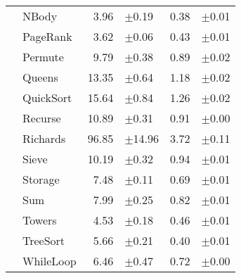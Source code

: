 \begin{tabular}{ll@{\hspace{6pt}}r@{\hspace{3pt}}l@{\hspace{6pt}}r@{\hspace{3pt}}l}
 & NBody & 3.96 & \scriptsize\textcolor{gray!60}{$\pm$0.19} & 0.38 & \scriptsize\textcolor{gray!60}{$\pm$0.01} \\
 & PageRank & 3.62 & \scriptsize\textcolor{gray!60}{$\pm$0.06} & 0.43 & \scriptsize\textcolor{gray!60}{$\pm$0.01} \\
 & Permute & 9.79 & \scriptsize\textcolor{gray!60}{$\pm$0.38} & 0.89 & \scriptsize\textcolor{gray!60}{$\pm$0.02} \\
 & Queens & 13.35 & \scriptsize\textcolor{gray!60}{$\pm$0.64} & 1.18 & \scriptsize\textcolor{gray!60}{$\pm$0.02} \\
 & QuickSort & 15.64 & \scriptsize\textcolor{gray!60}{$\pm$0.84} & 1.26 & \scriptsize\textcolor{gray!60}{$\pm$0.02} \\
 & Recurse & 10.89 & \scriptsize\textcolor{gray!60}{$\pm$0.31} & 0.91 & \scriptsize\textcolor{gray!60}{$\pm$0.00} \\
 & Richards & 96.85 & \scriptsize\textcolor{gray!60}{$\pm$14.96} & 3.72 & \scriptsize\textcolor{gray!60}{$\pm$0.11} \\
 & Sieve & 10.19 & \scriptsize\textcolor{gray!60}{$\pm$0.32} & 0.94 & \scriptsize\textcolor{gray!60}{$\pm$0.01} \\
 & Storage & 7.48 & \scriptsize\textcolor{gray!60}{$\pm$0.11} & 0.69 & \scriptsize\textcolor{gray!60}{$\pm$0.01} \\
 & Sum & 7.99 & \scriptsize\textcolor{gray!60}{$\pm$0.25} & 0.82 & \scriptsize\textcolor{gray!60}{$\pm$0.01} \\
 & Towers & 4.53 & \scriptsize\textcolor{gray!60}{$\pm$0.18} & 0.46 & \scriptsize\textcolor{gray!60}{$\pm$0.01} \\
 & TreeSort & 5.66 & \scriptsize\textcolor{gray!60}{$\pm$0.21} & 0.40 & \scriptsize\textcolor{gray!60}{$\pm$0.01} \\
 & WhileLoop & 6.46 & \scriptsize\textcolor{gray!60}{$\pm$0.47} & 0.72 & \scriptsize\textcolor{gray!60}{$\pm$0.00} \\
\bottomrule
\end{tabular}